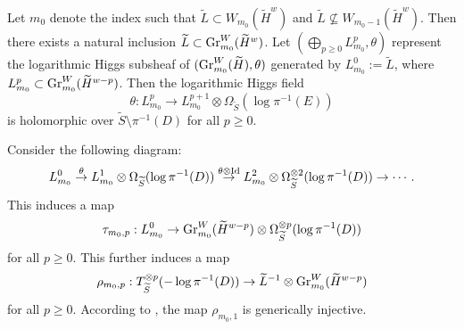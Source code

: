 \documentclass[11pt,letterpaper]{amsart}
\numberwithin{equation}{section}
\begin{document}
	Let $m_0$ denote the index such that $\widetilde{L} \subset W_{m_0}(\widetilde{H}^w)$ and $\widetilde{L} \nsubseteq W_{m_0-1}(\widetilde{H}^w)$. Then there exists a natural inclusion $\widetilde{L} \subset {\rm Gr}^W_{m_0}(\widetilde{H}^w)$. Let $(\bigoplus_{p\geq 0} L^p_{m_0}, \theta)$ represent the logarithmic Higgs subsheaf of $({\rm Gr}^W_{m_0}(\widetilde{H}), \theta)$ generated by $L^0_{m_0} := \widetilde{L}$, where $L^p_{m_0} \subset {\rm Gr}^W_{m_0}(\widetilde{H}^{w-p})$. Then the logarithmic Higgs field  
	$$  
	\theta: L^p_{m_0} \to L^{p+1}_{m_0} \otimes \Omega_{\widetilde{S}}(\log \pi^{-1}(E))  
	$$  
	is holomorphic over $\widetilde{S} \setminus \pi^{-1}(D)$ for all $p \geq 0$. 
	
	Consider the following diagram:  
	\begin{align*}  
		L^0_{m_0} \stackrel{\theta}{\to} L^1_{m_0} \otimes \Omega_{\widetilde{S}}(\log \pi^{-1}(D)) \stackrel{\theta \otimes {\rm Id}}{\to} L^2_{m_0} \otimes \Omega^{\otimes 2}_{\widetilde{S}}(\log \pi^{-1}(D)) \to \cdots.  
	\end{align*}  
	This induces a map  
	$$  
	\tau_{m_0,p}: L^0_{m_0} \to {\rm Gr}^W_{m_0}(\widetilde{H}^{w-p}) \otimes \Omega^{\otimes p}_{\widetilde{S}}(\log \pi^{-1}(D))  
	$$  
	for all $p \geq 0$.  
	This further induces a map  
	\begin{align}\label{align_first_theta}  
		\rho_{m_0,p}: T^{\otimes p}_{\widetilde{S}}(-\log \pi^{-1}(D)) \to \widetilde{L}^{-1} \otimes {\rm Gr}^W_{m_0}(\widetilde{H}^{w-p})  
	\end{align}  
	for all $p \geq 0$. According to \cite[Theorem D]{Deng2022}, the map $\rho_{m_0,1}$ is generically injective. 
\end{document}
